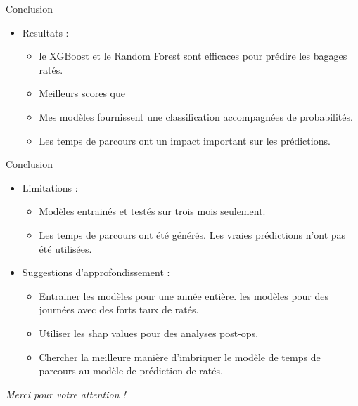 \documentclass{beamer}
\begin{document}
\begin{frame}{Conclusion} 
    \begin{itemize}
        \item Resultats :
            \begin{itemize}
                \item le XGBoost et le Random Forest sont efficaces pour prédire les bagages ratés.
                \item Meilleurs scores que \cite{MishandledBgas}
                \item Mes modèles fournissent une classification accompagnées de probabilités.
                \item Les temps de parcours ont un impact important sur les prédictions.
            \end{itemize}
    \end{itemize}
\end{frame}



\begin{frame}{Conclusion} 
    \begin{itemize}
        \item Limitations :
            \begin{itemize}
                \item Modèles entrainés et testés sur trois mois seulement.
                \item Les temps de parcours ont été générés. Les vraies prédictions n'ont pas été utilisées.
            \end{itemize}
        \item Suggestions d'approfondissement :
            \begin{itemize}
                \item Entrainer les modèles pour une année entière.
                \itemTester les modèles pour des journées avec des forts taux de ratés.
                \item Utiliser les shap values pour des analyses post-ops.
                \item Chercher la meilleure manière d'imbriquer le modèle de temps de parcours au modèle de prédiction de ratés.
            \end{itemize}
    \end{itemize}
\end{frame}




\begin{frame}
  \begin{center}
    \Huge \textit{Merci pour votre attention !}
  \end{center}
\end{frame}
\end{document}
